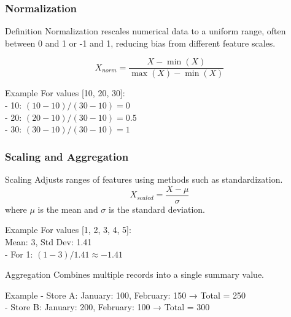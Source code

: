 \documentclass[aspectratio=169]{beamer}
\begin{document}
\begin{frame}[fragile]
    \frametitle{Normalization}
    \begin{block}{Definition}
        Normalization rescales numerical data to a uniform range, often between 0 and 1 or -1 and 1, reducing bias from different feature scales.
    \end{block}
    \begin{equation}
        X_{norm} = \frac{X - \min(X)}{\max(X) - \min(X)}
    \end{equation}
    \begin{block}{Example}
        For values [10, 20, 30]: \\
        - 10: \((10-10)/(30-10) = 0\) \\
        - 20: \((20-10)/(30-10) = 0.5\) \\
        - 30: \((30-10)/(30-10) = 1\)
    \end{block}
\end{frame}

\begin{frame}[fragile]
    \frametitle{Scaling and Aggregation}
    \begin{block}{Scaling}
        Adjusts ranges of features using methods such as standardization.
        \begin{equation}
            X_{scaled} = \frac{X - \mu}{\sigma}
        \end{equation}
        where \( \mu \) is the mean and \( \sigma \) is the standard deviation.
        \begin{block}{Example}
            For values [1, 2, 3, 4, 5]: \\
            Mean: 3, Std Dev: 1.41 \\
            - For 1: \((1-3)/1.41 \approx -1.41\) 
        \end{block}
    \end{block}
    
    \begin{block}{Aggregation}
        Combines multiple records into a single summary value.
        \begin{block}{Example}
            - Store A: {January: 100, February: 150} → Total = 250 \\
            - Store B: {January: 200, February: 100} → Total = 300
        \end{block}
    \end{block}
\end{frame}
\end{document}
